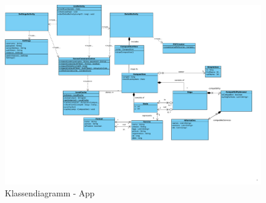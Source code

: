 \begin{figure}[h]
	\centering
	\includegraphics[width=\textwidth]{img/Diagramme/Klassen/App}
	\caption{Klassendiagramm - App}
	\label{fig:klassendiagramm-app}
\end{figure}

